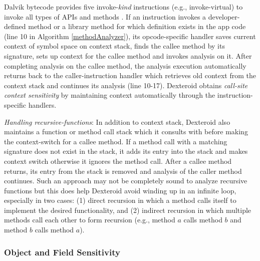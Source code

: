 \documentclass[10pt]{elsarticle}
\begin{document}
Dalvik bytecode provides five {\ttfamily invoke-}\emph{kind} instructions (e.g., {\ttfamily invoke-virtual}) to invoke all types of APIs and methods \cite{DalvikByteCode}. If an instruction invokes a developer-defined method or a library method for which definition exists in the app code (line 10 in Algorithm \ref{methodAnalyzer}), its opcode-specific handler saves current context of symbol space on context stack, finds the callee method by its signature, sets up context for the callee method and invokes analysis on it. After completing analysis on the callee method, the analysis execution automatically returns back to the caller-instruction handler which retrieves old context from the context stack and continues its analysis (line 10-17). Dexteroid obtains \emph{call-site context sensitivity} by maintaining context automatically through the instruction-specific handlers. 

{\noindent \emph{Handling recursive-functions}:} In addition to context stack, Dexteroid also maintains a function or method call stack which it consults with before making the context-switch for a callee method. If a method call with a matching signature does not exist in the stack, it adds its entry into the stack and makes context switch otherwise it ignores the method call. After a callee method returns, its entry from the stack is removed and analysis of the caller method continues. Such an approach may not be completely sound to analyze recursive functions but this does help Dexteroid avoid winding up in an infinite loop, especially in two cases: (1) direct recursion in which a method calls itself to implement the desired functionality, and (2) indirect recursion in which multiple methods call each other to form recursion (e.g., method $a$ calls method $b$ and method $b$ calls method $a$). 

\subsubsection{Object and Field Sensitivity} \label{objSensitivity}
\end{document}
